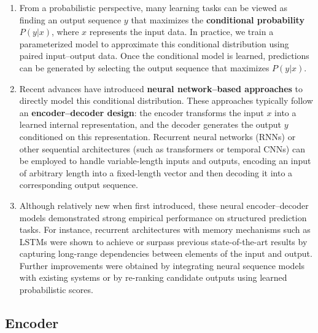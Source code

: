 \begin{enumerate}
    \item From a probabilistic perspective, many learning tasks can be viewed as finding an output sequence $y$ that maximizes the \textbf{conditional probability} $P(y|x)$, where $x$ represents the input data.
    In practice, we train a parameterized model to approximate this conditional distribution using paired input–output data. 
    Once the conditional model is learned, predictions can be generated by selecting the output sequence that maximizes $P(y|x)$.
    \hfill \cite{arxiv/1409.0473/NMT-Jointly-Learning-Align-Translate, common/online/chatgpt}

    \item Recent advances have introduced \textbf{neural network–based approaches} to directly model this conditional distribution. 
    These approaches typically follow an \textbf{encoder–decoder design}: the encoder transforms the input $x$ into a learned internal representation, and the decoder generates the output $y$ conditioned on this representation.
    Recurrent neural networks (RNNs) or other sequential architectures (such as transformers or temporal CNNs) can be employed to handle variable-length inputs and outputs, encoding an input of arbitrary length into a fixed-length vector and then decoding it into a corresponding output sequence.
    \hfill \cite{arxiv/1409.0473/NMT-Jointly-Learning-Align-Translate, common/online/chatgpt}

    \item Although relatively new when first introduced, these neural encoder–decoder models demonstrated strong empirical performance on structured prediction tasks.
    For instance, recurrent architectures with memory mechanisms such as LSTMs were shown to achieve or surpass previous state-of-the-art results by capturing long-range dependencies between elements of the input and output.
    Further improvements were obtained by integrating neural sequence models with existing systems or by re-ranking candidate outputs using learned probabilistic scores.
    \hfill \cite{arxiv/1409.0473/NMT-Jointly-Learning-Align-Translate, common/online/chatgpt}
\end{enumerate}


\subsection{Encoder}

